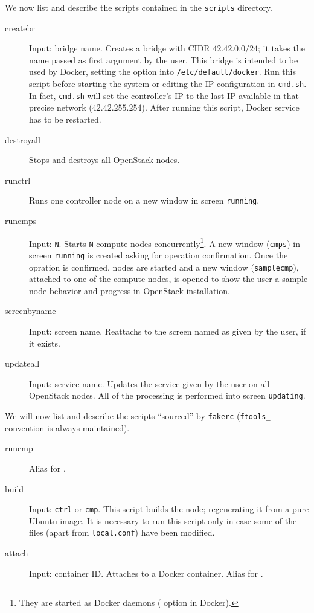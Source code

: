We now list and describe the scripts contained in the \texttt{scripts} directory.
\begin{description}
	\item[createbr] Input: bridge name. Creates a bridge with CIDR $42.42.0.0/24$; it takes the name passed as first argument by the user. This bridge is intended to be used by Docker, setting the option  into \texttt{/etc/default/docker}. Run this script before starting the system or editing the IP configuration in \texttt{cmd.sh}. In fact, \texttt{cmd.sh} will set the controller's IP to the last IP available in that precise network ($42.42.255.254$). After running this script, Docker service has to be restarted.
	\item[destroyall] Stops and destroys all OpenStack nodes.
	\item[runctrl] Runs one controller node on a new window in screen \texttt{running}.
	\item[runcmps] Input: \texttt{N}. Starts \texttt{N} compute nodes concurrently\footnote{They are started as Docker daemons ( option in Docker).}. A new window (\texttt{cmps}) in screen \texttt{running} is created asking for operation confirmation. Once the opration is confirmed, nodes are started and a new window (\texttt{samplecmp}), attached to one of the compute nodes, is opened to show the user a sample node behavior and progress in OpenStack installation.
	\item[screenbyname] Input: screen name. Reattachs to the screen named as given by the user, if it exists.
	\item[updateall] Input: service name. Updates the service given by the user on all OpenStack nodes. All of the processing is performed into screen \texttt{updating}.
\end{description}

We will now list and describe the scripts ``sourced'' by \texttt{fakerc} (\texttt{ftools\_} convention is always maintained).
\begin{description}
	\item[runcmp] Alias for .
	\item[build] Input: \texttt{ctrl} or \texttt{cmp}. This script builds the node; regenerating it from a pure Ubuntu image. It is necessary to run this script only in case some of the files (apart from \texttt{local.conf}) have been modified.
	\item[attach] Input: container ID. Attaches to a Docker container. Alias for .
\end{description}

